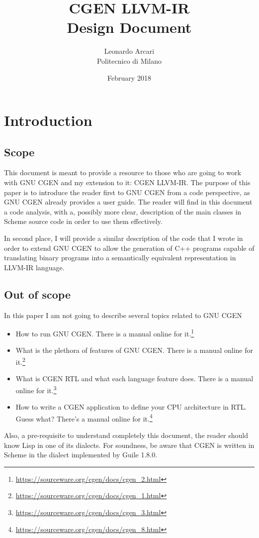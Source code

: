 \documentclass{article}
\begin{document}
\title{CGEN LLVM-IR \\ Design Document \vfill}
\author{Leonardo Arcari \\ Politecnico di Milano}
\date{February 2018}
\maketitle
\thispagestyle{empty}
\clearpage

\tableofcontents
\clearpage

\section{Introduction}
\subsection{Scope}
This document is meant to provide a resource to those who are going to work with GNU CGEN and my extension to it: CGEN LLVM-IR. The purpose of this paper is to introduce the reader first to GNU CGEN from a code perspective, as GNU CGEN already provides a user guide. The reader will find in this document a code analysis, with a, possibly more clear, description of the main classes in Scheme source code in order to use them effectively.

In second place, I will provide a similar description of the code that I wrote in order to extend GNU CGEN to allow the generation of C++ programs capable of translating binary programs into a semantically equivalent representation in LLVM-IR language.

\subsection{Out of scope}
In this paper I am not going to describe several topics related to GNU CGEN
\begin{itemize}
\item How to run GNU CGEN. There is a manual online for it.\footnote{\url{https://sourceware.org/cgen/docs/cgen_2.html}}
\item What is the plethora of features of GNU CGEN. There is a manual online for it.\footnote{\url{https://sourceware.org/cgen/docs/cgen_1.html}}
\item What is CGEN RTL and what each language feature does. There is a manual online for it.\footnote{\url{https://sourceware.org/cgen/docs/cgen_3.html}}
\item How to write a CGEN application to define your CPU architecture in RTL. Guess what? There's a manual online for it.\footnote{\url{https://sourceware.org/cgen/docs/cgen_8.html}}
\end{itemize}
Also, a pre-requisite to understand completely this document, the reader should know Lisp in one of its dialects. For soundness, be aware that CGEN is written in Scheme in the dialect implemented by Guile 1.8.0.
\end{document}
